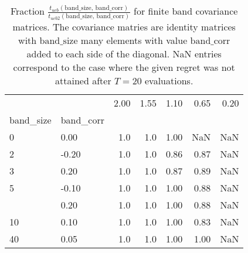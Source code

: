 \begin{table}
\centering
\caption{Fraction $\frac{t_{ucb}(\text{band\_size, band\_corr})}
    {t_{ucb2}(\text{band\_size, band\_corr})}$ for finite band covariance 
    matrices. The covariance matries are identity matrices with 
    $\text{band\_size}$ many elements with value $\text{band\_corr}$ added 
    to each side of the diagonal. NaN entries correspond to the 
    case where the given regret was not attained after $T=20$ evaluations.}
\label{fig:band_ucb_vs_ucb2}
\begin{tabular}{llrrrrr}
\toprule
   &       &  2.00 &  1.55 &  1.10 &  0.65 &  0.20 \\
band\_size & band\_corr &       &       &       &       &       \\
\midrule
0  &  0.00 &   1.0 &   1.0 &  1.00 &   NaN &   NaN \\
2  & -0.20 &   1.0 &   1.0 &  0.86 &  0.87 &   NaN \\
3  &  0.20 &   1.0 &   1.0 &  0.87 &  0.89 &   NaN \\
5  & -0.10 &   1.0 &   1.0 &  1.00 &  0.88 &   NaN \\
   &  0.20 &   1.0 &   1.0 &  1.00 &  0.88 &   NaN \\
10 &  0.10 &   1.0 &   1.0 &  1.00 &  0.83 &   NaN \\
40 &  0.05 &   1.0 &   1.0 &  1.00 &  1.00 &   NaN \\
\bottomrule
\end{tabular}
\end{table}
